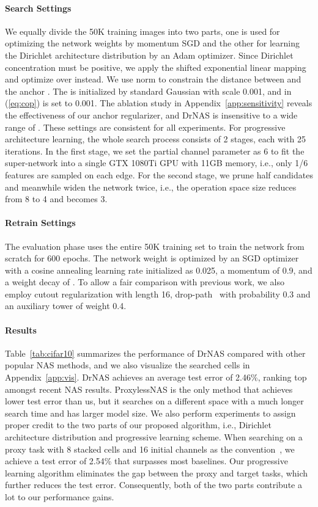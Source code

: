 \documentclass{article} \usepackage{iclr2021_conference,times}
\begin{document}
\paragraph{Search Settings}
We equally divide the 50K training images into two parts, one is used for optimizing the network weights by momentum SGD and the other for learning the Dirichlet architecture distribution by an Adam optimizer.
Since Dirichlet concentration  must be positive, we apply the shifted exponential linear mapping  and optimize over  instead.
We use  norm to constrain the distance between  and the anchor .
The  is initialized by standard Gaussian with scale 0.001, and  in (\ref{eq:cop}) is set to 0.001.
The ablation study in Appendix~\ref{app:sensitivity} reveals the effectiveness of our anchor regularizer, and DrNAS is insensitive to a wide range of . 
These settings are consistent for all experiments.
For progressive architecture learning, the whole search process consists of 2 stages, each with 25 iterations. 
In the first stage, we set the partial channel parameter  as 6 to fit the super-network into a single GTX 1080Ti GPU with 11GB memory, i.e., only 1/6 features are sampled on each edge.
For the second stage, we prune half candidates and meanwhile widen the network twice, i.e., the operation space size reduces from 8 to 4 and  becomes 3.

\paragraph{Retrain Settings}
The evaluation phase uses the entire 50K training set to train the network from scratch for 600 epochs.
The network weight is optimized by an SGD optimizer with a cosine annealing learning rate initialized as 0.025, a momentum of 0.9, and a weight decay of .
To allow a fair comparison with previous work, we also employ cutout regularization with length 16, drop-path~\citep{nasnet} with probability 0.3 and an auxiliary tower of weight 0.4. 

\paragraph{Results}
Table~\ref{tab:cifar10} summarizes the performance of DrNAS compared with other popular NAS methods, and we also visualize the searched cells in Appendix~\ref{app:vis}. 
DrNAS achieves an average test error of 2.46\%, ranking top amongst recent NAS results.
ProxylessNAS is the only method that achieves lower test error than us, but it searches on a different space with a much longer search time and has larger model size.
We also perform experiments to assign proper credit to the two parts of our proposed algorithm, i.e., Dirichlet architecture distribution and progressive learning scheme.
When searching on a proxy task with 8 stacked cells and 16 initial channels as the convention~\citep{darts,pcdarts}, we achieve a test error of 2.54\% that surpasses most baselines. 
Our progressive learning algorithm eliminates the gap between the proxy and target tasks, which further reduces the test error.
Consequently, both of the two parts contribute a lot to our performance gains.
\end{document}
